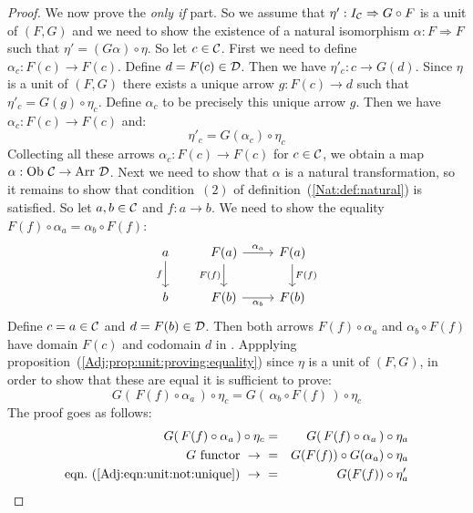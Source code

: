 \begin{proof}
    We now prove the {\em only if} part. So we assume that 
    $\eta':I_{\cal C}\Rightarrow G\circ F$ is a unit of $(F,G)$ and we need
    to show the existence of a natural isomorphism $\alpha:F\Rightarrow F$
    such that $\eta'=(G\alpha)\circ\eta$. So let $c\in\mbox{$\cal C$}$. First we need
    to define $\alpha_{c}:F(c)\to F(c)$. Define $d=F(c)\in\mbox{$\cal D$}$. Then we 
    have $\eta'_{c}:c\to G(d)$. Since $\eta$ is a unit of $(F,G)$ there exists
    a unique arrow $g:F(c)\to d$ such that $\eta'_{c}=G(g)\circ\eta_{c}$.
    Define $\alpha_{c}$ to be precisely this unique arrow $g$. Then we 
    have $\alpha_{c}:F(c)\to F(c)$ and:
        \begin{equation}\label{Adj:eqn:unit:not:unique}
            \eta'_{c}=G(\alpha_{c})\circ\eta_{c}
        \end{equation}
    Collecting all these arrows $\alpha_{c}:F(c)\to F(c)$ for $c\in\mbox{$\cal C$}$,
    we obtain a map $\alpha:\mbox{\rm Ob}\ \mbox{$\cal C$}\to\mbox{\rm Arr}\ \mbox{$\cal D$}$. Next we need to show 
    that $\alpha$ is a natural transformation, so it remains to show that
    condition~$(2)$ of definition~(\ref{Nat:def:natural}) is satisfied. So
    let $a,b\in\mbox{$\cal C$}$ and $f:a\to b$. We need to show the equality
    $F(f)\circ\alpha_{a}=\alpha_{b}\circ F(f)$:
    \[
        \begin{tikzcd}
            a\arrow[d,swap, "f"]
            &F(a)\arrow[r, "\alpha_{a}"]\arrow[d, swap,"F(f)"]
            &F(a)\arrow[d, "F(f)"]
            \\
            b
            &F(b)\arrow[r, swap, "\alpha_{b}"]
            &F(b)
        \end{tikzcd}
    \]
    Define $c=a\in\mbox{$\cal C$}$ and $d=F(b)\in\mbox{$\cal D$}$. Then both arrows 
    $F(f)\circ\alpha_{a}$ and $\alpha_{b}\circ F(f)$ have domain $F(c)$ and
    codomain $d$ in \Dat. Appplying 
    proposition~(\ref{Adj:prop:unit:proving:equality}) 
    since $\eta$ is a unit of $(F,G)$, in order to show that these are equal
    it is sufficient to prove:
        \[
            G(\,F(f)\circ\alpha_{a}\,)\circ\eta_{c}=
            G(\,\alpha_{b}\circ F(f)\,)\circ\eta_{c}
        \]
    The proof goes as follows:
        \begin{eqnarray*}G(\,F(f)\circ\alpha_{a}\,)\circ\eta_{c}
            &=&G(\,F(f)\circ\alpha_{a}\,)\circ\eta_{a}\\
            \mbox{$G$ functor}\ \to\ 
            &=&G(F(f))\circ G(\alpha_{a})\circ\eta_{a}\\
            \mbox{eqn.~(\ref{Adj:eqn:unit:not:unique})}\ \to\ 
            &=&G(F(f))\circ\eta'_{a}\\

\end{eqnarray*}
\end{proof}
